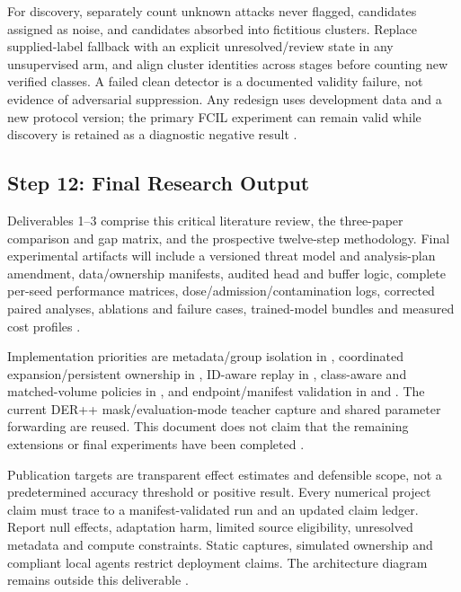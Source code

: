 \documentclass[10pt,a4paper]{article}
\begin{document}
For discovery, separately count unknown attacks never flagged, candidates assigned as noise, and candidates absorbed into fictitious clusters. Replace supplied-label fallback with an explicit unresolved/review state in any unsupervised arm, and align cluster identities across stages before counting new verified classes. A failed clean detector is a documented validity failure, not evidence of adversarial suppression. Any redesign uses development data and a new protocol version; the primary FCIL experiment can remain valid while discovery is retained as a diagnostic negative result \cite{cnd,repo}.

\subsection{Step 12: Final Research Output}
Deliverables 1--3 comprise this critical literature review, the three-paper comparison and gap matrix, and the prospective twelve-step methodology. Final experimental artifacts will include a versioned threat model and analysis-plan amendment, data/ownership manifests, audited head and buffer logic, complete per-seed performance matrices, dose/admission/contamination logs, corrected paired analyses, ablations and failure cases, trained-model bundles and measured cost profiles \cite{repo}.

Implementation priorities are metadata/group isolation in , coordinated expansion/persistent ownership in , ID-aware replay in , class-aware and matched-volume policies in , and endpoint/manifest validation in  and . The current DER++ mask/evaluation-mode teacher capture and shared parameter forwarding are reused. This document does not claim that the remaining extensions or final experiments have been completed \cite{repo}.

Publication targets are transparent effect estimates and defensible scope, not a predetermined accuracy threshold or positive result. Every numerical project claim must trace to a manifest-validated run and an updated claim ledger. Report null effects, adaptation harm, limited source eligibility, unresolved metadata and compute constraints. Static captures, simulated ownership and compliant local agents restrict deployment claims. The architecture diagram remains outside this deliverable \cite{repo}.

\appendix
\end{document}
